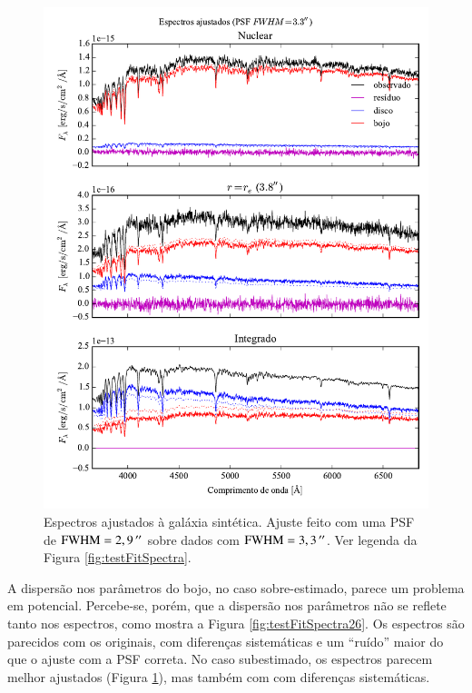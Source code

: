 \begin{figure}
	\includegraphics{figuras/simulation_spectra_psf33}
	\caption[Espectros ajustados (teste com PSF $\mathrm{FWHM} = 3,3\,\arcs$).]
	{Espectros ajustados à galáxia sintética. Ajuste feito com uma PSF de
	$\mathrm{FWHM} = 2,9\,^{\prime\prime}$ sobre dados com $\mathrm{FWHM} = 3,3\,\arcs$. Ver
	legenda da Figura \ref{fig:testFitSpectra}.} \label{fig:testFitSpectra33}
\end{figure}

A dispersão nos parâmetros do bojo, no caso sobre-estimado, parece um problema
em potencial. Percebe-se, porém, que a dispersão nos parâmetros não se reflete
tanto nos espectros, como mostra a Figura \ref{fig:testFitSpectra26}. Os
espectros são parecidos com os originais, com diferenças sistemáticas e um
``ruído'' maior do que o ajuste com a PSF correta. No caso subestimado, os
espectros parecem melhor ajustados (Figura \ref{fig:testFitSpectra33}), mas
também com com diferenças sistemáticas.

